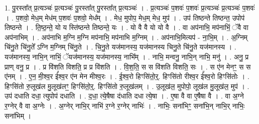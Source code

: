 \documentclass[17pt]{extarticle}
\begin{document}
1. पु॒रस्ता᳚त् प्र॒त्यञ्चः॑ प्र॒त्यञ्चः॑ पु॒रस्ता᳚त् पु॒रस्ता᳚त् प्र॒त्यञ्चः॑ । . प्र॒त्यञ्चः॑ प॒शवः॑ प॒शवः॑ प्र॒त्यञ्चः॑ प्र॒त्यञ्चः॑ प॒शवः॑ । . प॒शवो॒ मेध॒म् मेध॑म् प॒शवः॑ प॒शवो॒ मेध᳚म् । . मेध॒ मुपोप॒ मेध॒म् मेध॒ मुप॑ । . उप॑ तिष्ठन्ते तिष्ठन्त॒ उपोप॑ तिष्ठन्ते । . ति॒ष्ठ॒न्ते॒ यो य स्ति॑ष्ठन्ते तिष्ठन्ते॒ यः । . यो वै वै यो यो वै । . वा अप॑नाभि॒ मप॑नाभिं॒ ॅवै वा अप॑नाभिम् । . अप॑नाभि म॒ग्नि म॒ग्नि मप॑नाभि॒ मप॑नाभि म॒ग्निम् । . अप॑नाभि॒मित्यप॑ - ना॒भि॒म् । . अ॒ग्निम् चि॑नु॒ते चि॑नु॒ते᳚ ऽग्नि म॒ग्निम् चि॑नु॒ते । . चि॒नु॒ते यज॑मानस्य॒ यज॑मानस्य चिनु॒ते चि॑नु॒ते यज॑मानस्य । . यज॑मानस्य॒ नाभि॒न् नाभिं॒ ॅयज॑मानस्य॒ यज॑मानस्य॒ नाभि᳚म् । . नाभि॒ मन्वनु॒ नाभि॒न् नाभि॒ मनु॑ । . अनु॒ प्र प्राण् वनु॒ प्र । . प्र वि॑शति विशति॒ प्र प्र वि॑शति । . वि॒श॒ति॒ स स वि॑शति विशति॒ सः । . स ए॑न मेनꣳ॒॒ स स ए॑नम् । . ए॒न॒ मी॒श्व॒र ई᳚श्व॒र ए॑न मेन मीश्व॒रः । . ई॒श्व॒रो हिꣳसि॑तो॒र्॒. हिꣳसि॑तो रीश्व॒र ई᳚श्व॒रो हिꣳसि॑तोः । . हिꣳसि॑तो रु॒लूख॑ल मु॒लूख॑लꣳ॒॒ हिꣳसि॑तो॒र्॒. हिꣳसि॑तो रु॒लूख॑लम् । . उ॒लूख॑ल॒ मुपोपो॒ लूख॑ल मु॒लूख॑ल॒ मुप॑ । . उप॑ दधाति दधा॒ त्युपोप॑ दधाति । . द॒धा॒ त्ये॒षैषा द॑धाति दधा त्ये॒षा । . ए॒षा वै वा ए॒षैषा वै । . वा अ॒ग्ने र॒ग्नेर् वै वा अ॒ग्नेः । . अ॒ग्नेर् नाभि॒र् नाभि॑ र॒ग्ने र॒ग्नेर् नाभिः॑ । . नाभिः॒ सना॑भिꣳ॒॒ सना॑भि॒न् नाभि॒र् नाभिः॒ सना॑भिम् । \newline
\end{document}
